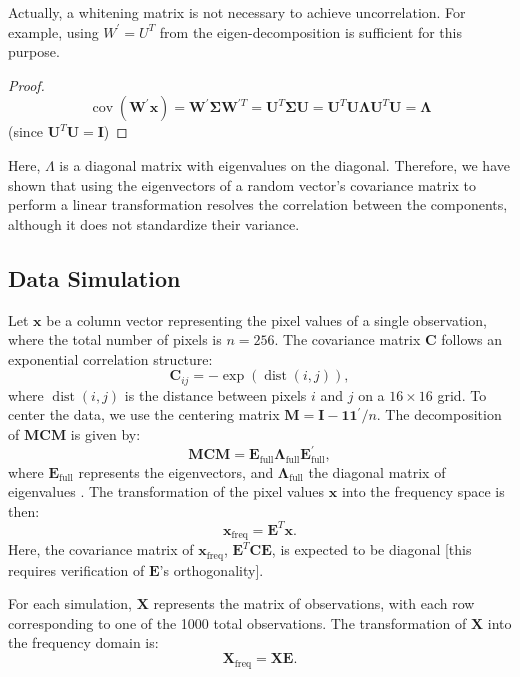 \documentclass[12pt]{article}
\begin{document}
Actually, a whitening matrix is not necessary to achieve uncorrelation. For example, using \( W^{\prime} = U^T \) from the eigen-decomposition is sufficient for this purpose.

\begin{proof}
  \[
    \operatorname{cov}\left(\mathbf{W}^{\prime} \mathbf{x}\right)=\mathbf{W}^{\prime} \boldsymbol{\Sigma} \mathbf{W}^{\prime T}=\mathbf{U}^T \boldsymbol{\Sigma} \mathbf{U}=\mathbf{U}^T \mathbf{U} \boldsymbol{\Lambda} \mathbf{U}^T \mathbf{U}=\boldsymbol{\Lambda}
  \]
  (since \( \mathbf{U}^T \mathbf{U}=\mathbf{I} \))
\end{proof}

Here, \( \Lambda \) is a diagonal matrix with eigenvalues on the diagonal. Therefore, we have shown that using the eigenvectors of a random vector's covariance matrix to perform a linear transformation resolves the correlation between the components, although it does not standardize their variance.




\subsection*{Data Simulation}

Let \( \mathbf{x} \) be a column vector representing the pixel values of a single observation, where the total number of pixels is \( n = 256 \). The covariance matrix \( \mathbf{C} \) follows an exponential correlation structure:
\[
\mathbf{C}_{ij} = -\exp(\operatorname{dist}(i,j)),
\]
where \( \operatorname{dist}(i,j) \) is the distance between pixels \( i \) and \( j \) on a \( 16 \times 16 \) grid. To center the data, we use the centering matrix \( \mathbf{M} = \mathbf{I} - \mathbf{1} \mathbf{1}^{\prime} / n \). The decomposition of \( \mathbf{MCM} \) is given by:
\[
\mathbf{MCM} = \mathbf{E}_{\text{full}} \mathbf{\Lambda}_{\text{full}} \mathbf{E}_{\text{full}}^{\prime},
\]
where \( \mathbf{E}_{\text{full}} \) represents the eigenvectors, and \( \mathbf{\Lambda}_{\text{full}} \) the diagonal matrix of eigenvalues \cite{murakami2019eigenvector}. The transformation of the pixel values \( \mathbf{x} \) into the frequency space is then:
\[
\mathbf{x}_{\text{freq}} = \mathbf{E}^T \mathbf{x}.
\]
Here, the covariance matrix of \( \mathbf{x}_{\text{freq}} \), \( \mathbf{E}^T \mathbf{C} \mathbf{E} \), is expected to be diagonal [this requires verification of \( \mathbf{E} \)'s orthogonality].

For each simulation, \( \mathbf{X} \) represents the matrix of observations, with each row corresponding to one of the 1000 total observations. The transformation of \( \mathbf{X} \) into the frequency domain is:
\[
\mathbf{X}_{\mathrm{freq}} = \mathbf{X} \mathbf{E}.
\]
\end{document}
